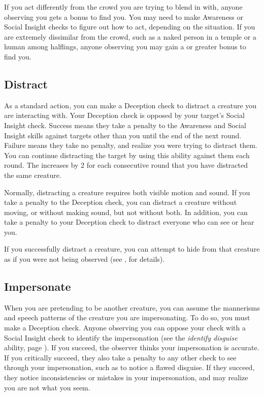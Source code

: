         If you act differently from the crowd you are trying to blend in with, anyone observing you gets a  bonus to find you. You may need to make Awareness or Social Insight checks to figure out how to act, depending on the situation. If you are extremely dissimilar from the crowd, such as a naked person in a temple or a human among halflings, anyone observing you may gain a  or greater bonus to find you.

    \subsection{Distract}\label{Distract}
        As a standard action, you can make a Deception check to distract a creature you are interacting with.
        Your Deception check is opposed by your target's Social Insight check.
        Success means they take a  penalty to the Awareness and Social Insight skills against targets other than you until the end of the next round.
        Failure means they take no penalty, and realize you were trying to distract them.
        You can continue distracting the target by using this ability against them each round.
        The  increases by 2 for each consecutive round that you have distracted the same creature.

        Normally, distracting a creature requires both visible motion and sound.
        If you take a  penalty to the Deception check, you can distract a creature without moving, or without making sound, but not without both.
        In addition, you can take a  penalty to your Deception check to distract everyone who can see or hear you.

        If you successfully distract a creature, you can attempt to hide from that creature as if you were not being observed (see , for details).

    \subsection{Impersonate}\label{Impersonate}
        When you are pretending to be another creature, you can assume the mannerisms and speech patterns of the creature you are impersonating.
        To do so, you must make a Deception check.
        Anyone observing you can oppose your check with a Social Insight check to identify the impersonation (see the \textit{identify disguise} ability, page ).
        If you succeed, the observer thinks your impersonation is accurate.
        If you critically succeed, they also take a  penalty to any other check to see through your impersonation, such as to notice a flawed disguise.
        If they succeed, they notice inconsistencies or mistakes in your impersonation, and may realize you are not what you seem.

